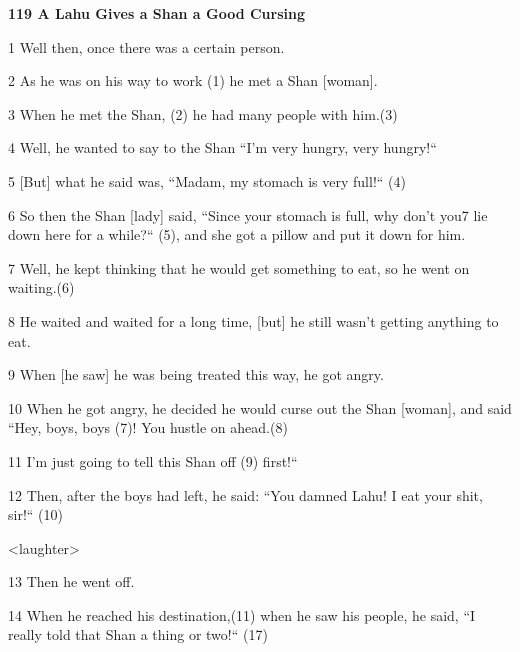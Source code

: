 
\textbf{119 A Lahu Gives a Shan a Good Cursing}

1 Well then, once there was a certain person.

2 As he was on his way to work (1) he met a Shan [woman].

3 When he met the Shan, (2) he had many people with him.(3)

4 Well, he wanted to say to the Shan ``I'm very hungry, very hungry!``

5 [But] what he said was, ``Madam, my stomach is very full!`` (4)

6 So then the Shan [lady] said, ``Since your stomach is full, why don't
you7 lie down here for a while?`` (5), and she got a pillow and put it
down for him.

7 Well, he kept thinking that he would get something to eat, so he went on waiting.(6)

8 He waited and waited for a long time, [but] he still wasn't getting anything
to eat.

9 When [he saw] he was being treated this way,  he got angry.

10 When he got angry, he decided he would curse out the Shan [woman], and said
``Hey, boys, boys (7)! You hustle on ahead.(8)

11 I'm just going to tell this Shan off (9) first!``

12 Then, after the boys had left, he said: ``You damned Lahu! I eat your
shit, sir!`` (10)

<laughter>

13 Then he went off.

14 When he reached his destination,(11) when he saw his people, he said, ``I
really told that Shan a thing or two!`` (17)

